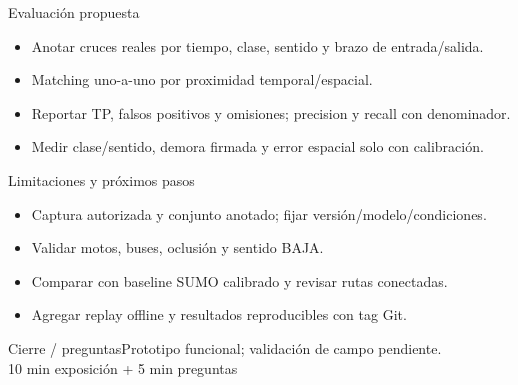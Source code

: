 \documentclass[aspectratio=169]{beamer}
\begin{document}
\begin{frame}{Evaluación propuesta}\begin{itemize}\item Anotar cruces reales por tiempo, clase, sentido y brazo de entrada/salida.\item Matching uno-a-uno por proximidad temporal/espacial.\item Reportar TP, falsos positivos y omisiones; precision y recall con denominador.\item Medir clase/sentido, demora firmada y error espacial solo con calibración.\end{itemize}\end{frame}
\begin{frame}{Limitaciones y próximos pasos}\begin{itemize}\item Captura autorizada y conjunto anotado; fijar versión/modelo/condiciones.\item Validar motos, buses, oclusión y sentido BAJA.\item Comparar con baseline SUMO calibrado y revisar rutas conectadas.\item Agregar replay offline y resultados reproducibles con tag Git.\end{itemize}\end{frame}
\begin{frame}{Cierre / preguntas}\centering\Large Prototipo funcional; validación de campo pendiente.\\[1em]10 min exposición + 5 min preguntas\end{frame}
\end{document}
